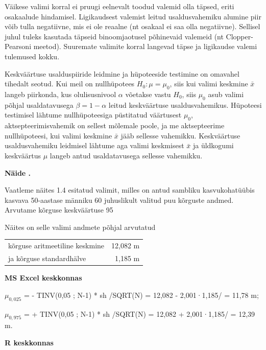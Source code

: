 \documentclass[
]{book}
\newcounter{naidis}[chapter]
\newenvironment{naidis}
{%
\definecolor{shadecolor}{rgb}{200, 200, 0}
\par\parindent 0pt
\begin{framed}
\begin{naitefont}
\refstepcounter{naidis}\textbf{Näide \thenaidis.}
}
{%
\end{naitefont}%
\end{framed}
}%
\begin{document}
Väikese valimi korral ei pruugi eelnevalt toodud valemid olla täpsed, eriti osakaalude hindamisel. Ligikaudsest valemist leitud usaldusvahemiku alumine piir võib tulla negatiivne, mis ei ole reaalne (nt osakaal ei saa olla negatiivne). Sellisel juhul tuleks kasutada täpseid binoomjaotusel põhinevaid valemeid (nt Clopper-Pearsoni meetod). Suuremate valimite korral langevad täpse ja ligikaudse valemi tulemused kokku.

Keskväärtuse usalduspiiride leidmine ja hüpoteeside testimine on omavahel tihedalt seotud. Kui meil on nullhüpotees \(H_0: \mu = \mu_0\), siis kui valimi keskmine \(\bar{x}\) langeb piirkonda, kus olulisusnivool \(\alpha\) võetakse vastu \(H_0\), siis \(\mu_0\) asub valimi põhjal usaldatavusega \(\beta = 1-\alpha\) leitud keskväärtuse usaldusvahemikus. Hüpoteesi testimisel lähtume nullhüpoteesiga püstitatud väärtusest \(\mu_0\), aktsepteerimisvahemik on sellest mõlemale poole, ja me aktsepteerime nullhüpoteesi, kui valimi keskmine \(\bar{x}\) jääb sellesse vahemikku. Keskväärtuse usaldusvahemiku leidmisel lähtume aga valimi keskmisest \(\bar{x}\) ja üldkogumi keskväärtus \(\mu\) langeb antud usaldatavusega sellesse vahemikku.

\begin{naidis}
Vaatleme näites 1.4 esitatud valimit, milles on antud sambliku kasvukohatüübis kasvava 50-aastase männiku 60 juhuslikult valitud puu kõrguste andmed. Arvutame kõrguse keskväärtuse 95%
\end{naidis}

Näites on selle valimi andmete põhjal arvutatud

\begin{tabular}{lr}
kõrguse aritmeetiline keskmine & 12,082 m \\
ja kõrguse standardhälve & 1,185 m \\
\end{tabular}

\textbf{MS Excel keskkonnas }

\(\mu_{0,025}\) = - TINV(0,05 ; N-1) * sh /SQRT(N) = 12,082 - 2,001·1,185/ = 11,78 m;

\(\mu_{0,975}\) = + TINV(0,05 ; N-1) * sh /SQRT(N) = 12,082 + 2,001·1,185/ = 12,39 m.

\textbf{R keskkonnas}
\end{document}
